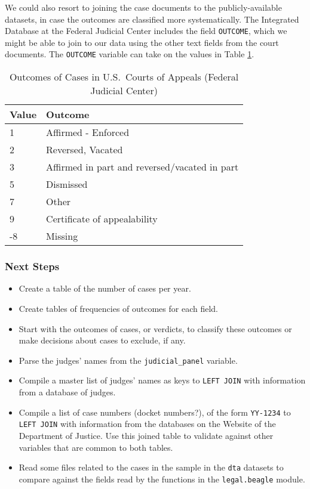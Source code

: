 \documentclass[11pt]{paper}
\begin{document}
We could also resort to joining the case documents to the publicly-available
datasets, in case the outcomes are classified more systematically. 
The Integrated Database at the Federal Judicial Center
includes the field \texttt{OUTCOME}, which we might be able to
join to our data using the other text fields from the court documents.  
% 
The \texttt{OUTCOME} variable can take on the values
in Table \ref{tab:outcome_list_FJC}.
% 
\begin{table}[ht]
\centering
\begin{tabular}{l l}
  \hline
	Value 		& Outcome \\ 
  \hline
	1 				& Affirmed - Enforced \\
	2 				& Reversed, Vacated \\
	3 				& Affirmed in part and reversed/vacated in part \\
	5 				& Dismissed \\
	7 				& Other  \\
	9 				& Certificate of appealability \\
	-8 			& Missing \\
   \hline
\end{tabular}
\caption{Outcomes of Cases in U.S.~Courts of Appeals (Federal Judicial Center)} 
\label{tab:outcome_list_FJC}
\end{table}
% 


\subsubsection{Next Steps}

\begin{itemize}

	\item Create a table of the number of cases per year. 

	\item Create tables of frequencies of outcomes for each field. 

	\item Start with the outcomes of cases, or verdicts, 
		to classify these outcomes or make decisions about cases to exclude, if any. 

	\item Parse the judges' names from the \texttt{judicial\_panel} variable. 

	\item Compile a master list of judges' names as keys 
		to \texttt{LEFT JOIN} with information from a database of judges. 
 
	\item Compile a list of case numbers (docket numbers?), 
		of the form \texttt{YY-1234}
		to \texttt{LEFT JOIN} with information from the databases 
		on the Website of the Department of Justice. 
		Use this joined table to validate against other variables that are 
		common to both tables. 

	\item Read some files related to the cases in the sample 
		in the \texttt{dta} datasets to compare against the fields
		read by the functions in the \texttt{legal.beagle} module.

\end{itemize}
\end{document}
